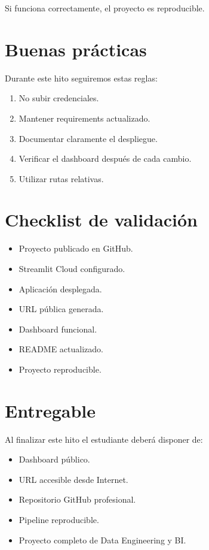 Si funciona correctamente, el proyecto es reproducible.

\section{Buenas prácticas}

Durante este hito seguiremos estas reglas:

\begin{enumerate}
\item No subir credenciales.
\item Mantener requirements actualizado.
\item Documentar claramente el despliegue.
\item Verificar el dashboard después de cada cambio.
\item Utilizar rutas relativas.
\end{enumerate}

\section{Checklist de validación}

\begin{itemize}
\item[$\Box$] Proyecto publicado en GitHub.
\item[$\Box$] Streamlit Cloud configurado.
\item[$\Box$] Aplicación desplegada.
\item[$\Box$] URL pública generada.
\item[$\Box$] Dashboard funcional.
\item[$\Box$] README actualizado.
\item[$\Box$] Proyecto reproducible.
\end{itemize}

\section{Entregable}

Al finalizar este hito el estudiante deberá disponer de:

\begin{itemize}
\item Dashboard público.
\item URL accesible desde Internet.
\item Repositorio GitHub profesional.
\item Pipeline reproducible.
\item Proyecto completo de Data Engineering y BI.
\end{itemize}

